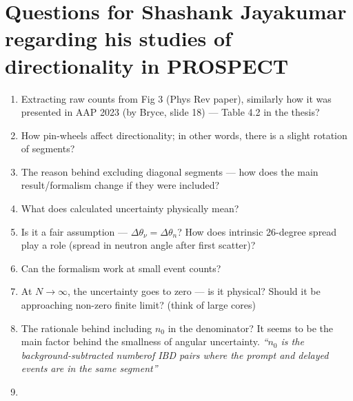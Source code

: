 \section{Questions for Shashank Jayakumar regarding his studies of directionality in PROSPECT}

\begin{enumerate}
    \item Extracting raw counts from Fig 3 (Phys Rev paper), similarly how it was presented in AAP 2023 (by Bryce, slide 18) --- Table 4.2 in the thesis?
    \item How pin-wheels affect directionality; in other words, there is a slight rotation of segments?
    \item The reason behind excluding diagonal segments --- how does the main result/formalism change if they were included?
    \item What does calculated uncertainty physically mean?
    \item Is it a fair assumption --- $\Delta \theta_\nu = \Delta \theta_n$? How does intrinsic 26-degree spread play a role (spread in neutron angle after first scatter)?
    \item Can the formalism work at small event counts?
    \item At $N \to \infty$, the uncertainty goes to zero --- is it physical? Should it be approaching non-zero finite limit? (think of large cores)
    \item The rationale behind including $n_0$ in the denominator? It seems to be the main factor behind the smallness of angular uncertainty. {\it ``$n_0$ is the background-subtracted numberof IBD pairs where the prompt and delayed events
are in the same segment''}
\item 
\end{enumerate}

